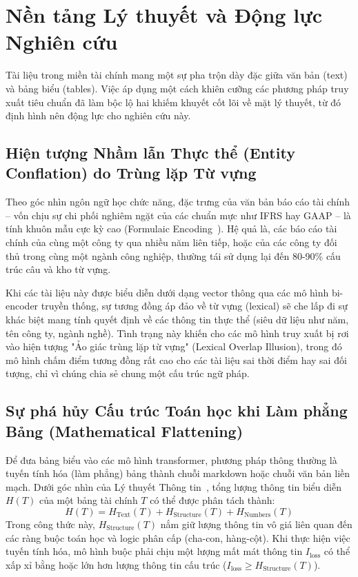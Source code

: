 \documentclass[10pt, a4paper]{article}
\begin{document}
\section{Nền tảng Lý thuyết và Động lực Nghiên cứu}

Tài liệu trong miền tài chính mang một sự pha trộn dày đặc giữa văn bản (text) và bảng biểu (tables). Việc áp dụng một cách khiên cưỡng các phương pháp truy xuất tiêu chuẩn đã làm bộc lộ hai khiếm khuyết cốt lõi về mặt lý thuyết, từ đó định hình nên động lực cho nghiên cứu này.

\subsection{Hiện tượng Nhầm lẫn Thực thể (Entity Conflation) do Trùng lặp Từ vựng}
Theo góc nhìn ngôn ngữ học chức năng, đặc trưng của văn bản báo cáo tài chính -- vốn chịu sự chi phối nghiêm ngặt của các chuẩn mực như IFRS hay GAAP -- là tính khuôn mẫu cực kỳ cao (Formulaic Encoding~\cite{halliday1994}). Hệ quả là, các báo cáo tài chính của cùng một công ty qua nhiều năm liên tiếp, hoặc của các công ty đối thủ trong cùng một ngành công nghiệp, thường tái sử dụng lại đến 80-90\% cấu trúc câu và kho từ vựng. 

Khi các tài liệu này được biểu diễn dưới dạng vector thông qua các mô hình bi-encoder truyền thống, sự tương đồng áp đảo về từ vựng (lexical) sẽ che lấp đi sự khác biệt mang tính quyết định về các thông tin thực thể (siêu dữ liệu như năm, tên công ty, ngành nghề). Tình trạng này khiến cho các mô hình truy xuất bị rơi vào hiện tượng "Ảo giác trùng lặp từ vựng" (Lexical Overlap Illusion), trong đó mô hình chấm điểm tương đồng rất cao cho các tài liệu sai thời điểm hay sai đối tượng, chỉ vì chúng chia sẻ chung một cấu trúc ngữ pháp.

\subsection{Sự phá hủy Cấu trúc Toán học khi Làm phẳng Bảng (Mathematical Flattening)}
Để đưa bảng biểu vào các mô hình transformer, phương pháp thông thường là tuyến tính hóa (làm phẳng) bảng thành chuỗi markdown hoặc chuỗi văn bản liền mạch. Dưới góc nhìn của Lý thuyết Thông tin~\cite{cover2006}, tổng lượng thông tin biểu diễn $H(T)$ của một bảng tài chính $T$ có thể được phân tách thành:
\begin{equation}
    H(T) = H_{\text{Text}}(T) + H_{\text{Structure}}(T) + H_{\text{Numbers}}(T)
\end{equation}
Trong công thức này, $H_{\text{Structure}}(T)$ nắm giữ lượng thông tin vô giá liên quan đến các ràng buộc toán học và logic phân cấp (cha-con, hàng-cột). Khi thực hiện việc tuyến tính hóa, mô hình buộc phải chịu một lượng mất mát thông tin $I_{\text{loss}}$ có thể xấp xỉ bằng hoặc lớn hơn lượng thông tin cấu trúc ($I_{\text{loss}} \ge H_{\text{Structure}}(T)$). 
\end{document}
